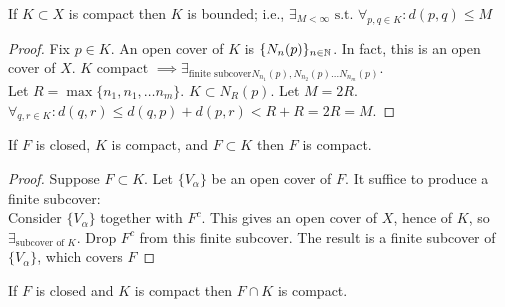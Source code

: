 \begin{thm}
	If $K \subset X$ is compact then $K$ is bounded; i.e., $\exists_{M< \infty } \text{ s.t. }  \forall_{p,q \in K}: d(p,q) \le M$
	\begin{proof}
		Fix $p \in K$. An open cover of $K$ is $\{N_n(p)\}_{n \in \mathbb{N} }$. In fact, this is an open cover of $X$.
		$K \text{ compact }\implies \exists_{\text{finite subcover} N_{n_1}(p),N_{n_2}(p) \ldots N_{n_m}(p)}$.\\
		Let $R = \max\{n_1,n_1,\ldots n_m\} $. $K \subset N_{R}(p)$. Let $M=2R$. $\forall_{q,r \in K}: d(q,r)\le d(q,p)+d(p,r)<R+R=2R=M$.
	\end{proof}
\end{thm}
\begin{thm}[35]
	If $F$ is closed, $K$ is compact, and $F \subset K$ then $F$ is compact.
	\begin{proof}
		Suppose $F \subset K$. Let $\{V_{\alpha}\}$ be an open cover of $F$. It suffice to produce a finite subcover:\\
		Consider $\{V_{\alpha}\}$ together with $F^{c}$. This gives an open cover of $X$, hence of $K$, so $\exists_{\text{subcover of $K$}}$.
		Drop $F^{c}$ from this finite subcover. The result is a finite subcover of $\{V_{\alpha}\}$, which covers $F$
	\end{proof}
	\begin{corollary}
		If $F$ is closed and $K$ is compact then $F \cap K$ is compact.
	\end{corollary}
\end{thm}

